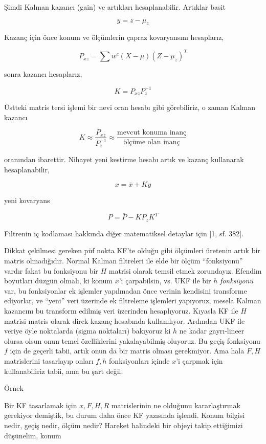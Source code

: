 \documentclass[12pt,fleqn]{article}\usepackage{../../common}
\begin{document}
Şimdi Kalman kazancı (gain) ve artıkları hesaplanabilir. Artıklar basit

$$ y = z - \mu_z$$

Kazanç için önce konum ve ölçümlerin çapraz kovaryansını hesaplarız, 

$$ P_{xz} = \sum w^c (X-\mu)(Z-\mu_z)^T    $$

sonra kazancı hesaplarız, 

$$ K = P_{xz}P_z^{-1} $$

Üstteki matris tersi işlemi bir nevi oran hesabı gibi görebiliriz, o zaman
Kalman kazancı

$$ 
K \approx \frac{P_{xz}}{P_z^{-1}} \approx 
\frac{\textrm{mevcut konuma inanç}}{\textrm{ölçüme olan inanç}}
$$

oranından ibarettir. Nihayet yeni kestirme hesabı artık ve kazanç
kullanarak hesaplanabilir,

$$ x = \bar{x} + Ky $$

yeni kovaryans

$$ P = \bar{P} - KP_zK^T $$

Filtrenin iç kodlaması hakkında diğer matematiksel detaylar için [1, sf. 382].

Dikkat çekilmesi gereken püf nokta KF'te olduğu gibi ölçümleri üretenin
artık bir matris olmadığıdır. Normal Kalman filtreleri ile elde bir ölçüm
``fonksiyonu'' vardır fakat bu fonksiyonu bir $H$ matrisi olarak temsil
etmek zorundayız. Efendim boyutları düzgün olmalı, ki konum $x$'i
çarpabilsin, vs. UKF ile bir $h$ {\em fonksiyonu} var, bu fonksiyonlar ek
işlemler yapılmadan önce verinin kendisini transforme ediyorlar, ve
``yeni'' veri üzerinde ek filtreleme işlemleri yapıyoruz, mesela Kalman
kazancını bu transform edilmiş veri üzerinden hesaplıyoruz. Kıyasla KF ile
$H$ matrisi matris olarak direk kazanç hesabında kullanılıyor. Ardından UKF
ile veriye öyle noktalarda (sigma noktaları) bakıyoruz ki $h$ ne kadar
gayrı-lineer olursa olsun onun temel özelliklerini yakalayabilmiş
oluyoruz. Bu geçiş fonksiyonu $f$ için de geçerli tabii, artık onun da bir
matris olması gerekmiyor. Ama hala $F,H$ matrislerini tasarlayıp onları
$f,h$ fonksiyonları içinde $x$'i çarpmak için kullanabiliriz tabii, ama bu
şart değil. 

Örnek

Bir KF tasarlamak için $x,F,H,R$ matrislerinin ne olduğunu kararlaştırmak
gerekiyor demiştik, bu durum daha önce KF yazısında işlendi. Konum bilgisi
nedir, geçiş nedir, ölçüm nedir? Hareket halindeki bir objeyi takip
ettiğimizi düşünelim, konum
\end{document}
